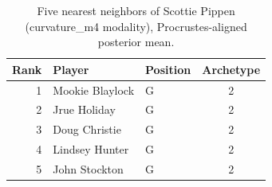 \begin{table}[htbp]
  \centering\small
  \begin{tabular}{rllc}
    \toprule
    Rank & Player & Position & Archetype \\
    \midrule
    1 & Mookie Blaylock & G & 2 \\
    2 & Jrue Holiday & G & 2 \\
    3 & Doug Christie & G & 2 \\
    4 & Lindsey Hunter & G & 2 \\
    5 & John Stockton & G & 2 \\
    \bottomrule
  \end{tabular}
  \caption{Five nearest neighbors of Scottie Pippen (curvature_m4 modality), Procrustes-aligned posterior mean.}
  \label{tab:Scottie_Pippen_neighbors_curvature_m4}
\end{table}

